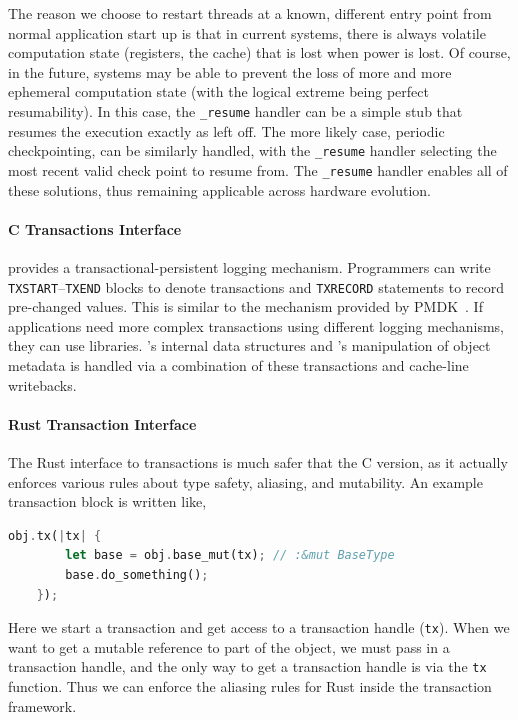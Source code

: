 The reason we choose to restart threads at a known, different entry point from normal application
start up is that in current systems, there is always volatile computation state (\eg registers, the
cache) that is lost when power is lost. Of course, in the future, systems may be able to prevent the
loss of more and more ephemeral computation state (with the logical extreme being perfect
resumability). In this case, the \texttt{\_resume} handler can be a simple stub that resumes the
execution exactly as left off. The more likely case, periodic checkpointing, can be similarly
handled, with the \texttt{\_resume} handler selecting the most recent valid check point to resume
from. The \texttt{\_resume} handler enables all of these solutions, thus remaining applicable across
hardware evolution.

\paragraph{C Transactions Interface}
\Twizzler provides a transactional-persistent logging mechanism.
Programmers can write \texttt{TXSTART}--\texttt{TXEND} blocks to denote transactions and \texttt{TXRECORD}
statements to record pre-changed values. This is similar to the mechanism provided by
PMDK~\cite{libpmem}. If applications need more complex
transactions using different logging mechanisms, they can use libraries. \Twizzler's internal data
structures and \libcore's manipulation of object metadata is handled via a combination of these
transactions and cache-line writebacks.


\paragraph{Rust Transaction Interface}

The Rust interface to transactions is much safer that the C version, as it actually enforces various rules about type
safety, aliasing, and mutability. An example transaction block is written like,

\begin{lstlisting}[language=Rust]
    obj.tx(|tx| {
        let base = obj.base_mut(tx); // :&mut BaseType
        base.do_something();
    });
\end{lstlisting}

Here we start a transaction and get access to a transaction handle (\texttt{tx}). When we want to get a mutable
reference to part of the object, we must pass in a transaction handle, and the only way to get a transaction handle is
via the \texttt{tx} function. Thus we can enforce the aliasing rules for Rust inside the transaction framework.

